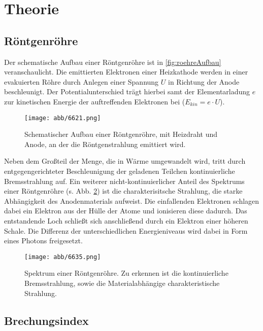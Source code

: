 \section{Theorie}
\label{sec:Theorie}

\subsection{Röntgenröhre}

Der schematische Aufbau einer Röntgenröhre ist in \autoref{fig:roehreAufbau} veranschaulicht.
Die emittierten Elektronen einer Heizkathode werden in einer evakuierten Röhre durch Anlegen einer Spannung $U$ in Richtung der Anode beschleunigt.
Der Potentialunterschied trägt hierbei samt der Elementarladung $e$ zur kinetischen Energie der auftreffenden Elektronen bei ($E_{kin} = e \cdot U$).
\begin{figure}
    \centering
    \texttt{[image: abb/6621.png]}
    \caption{Schematischer Aufbau einer Röntgenröhre, mit Heizdraht und Anode, an der die Röntgenstrahlung emittiert wird. \cite{roehre}}
    \label{fig:roehreAufbau}
\end{figure}
Neben dem Großteil der Menge, die in Wärme umgewandelt wird, tritt durch entgegengerichteter Beschleunigung der geladenen Teilchen kontinuierliche Bremsstrahlung auf.
Ein weiterer nicht-kontinuierlicher Anteil des Spektrums einer Röntgenröhre (s. Abb. \ref{fig:roehreSpektrum}) ist die charakterisitsche Strahlung,
die starke Abhängigkeit des Anodenmaterials aufweist. Die einfallenden Elektronen schlagen dabei ein Elektron aus der Hülle der Atome und ionisieren diese dadurch.
Das entstandende Loch schließt sich anschließend durch ein Elektron einer höheren Schale. Die Differenz der unterschiedlichen Energieniveaus wird dabei in Form eines Photons freigesetzt.
\begin{figure}
    \centering
    \texttt{[image: abb/6635.png]}
    \caption{Spektrum einer Röntgenröhre. Zu erkennen ist die kontinuierliche Bremsstrahlung, sowie die Materialabhängige charakteristische Strahlung.\cite{roehre}}
    \label{fig:roehreSpektrum}
\end{figure}

\subsection{Brechungsindex}
